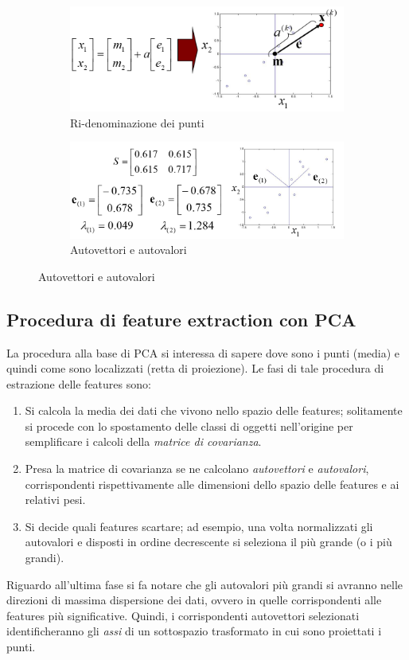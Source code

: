 \documentclass[a4paper,oneside,titlepage]{book}
\begin{document}
\begin{figure}[htp]
	\begin{subfigure}{0.49\textwidth}
	    \centering
		\includegraphics[width=\textwidth, height=\textheight, keepaspectratio]{passo1.png}
		\caption{Ri-denominazione dei punti}
	\end{subfigure}
	\hfill
	\begin{subfigure}{0.49\textwidth}
	    \centering
		\includegraphics[width=\textwidth, height=\textheight, keepaspectratio]{passo5.png}
		\caption{Autovettori e autovalori}
	\end{subfigure}
\end{figure}

\subsection{Procedura di feature extraction con PCA}
La procedura alla base di PCA si interessa di sapere dove sono i punti (media) e quindi come sono localizzati (retta di proiezione). Le fasi di tale procedura di estrazione delle features sono:
\begin{enumerate}
    \item Si calcola la media dei dati che vivono nello spazio delle features; solitamente si procede con lo spostamento delle classi di oggetti nell'origine per semplificare i calcoli della \textit{matrice di covarianza}.
    \item Presa la matrice di covarianza se ne calcolano \textit{autovettori} e \textit{autovalori}, corrispondenti rispettivamente alle dimensioni dello spazio delle features e ai relativi pesi.
    \item Si decide quali features scartare; ad esempio, una volta normalizzati gli autovalori e disposti in ordine decrescente si seleziona il più grande (o i più grandi). 
\end{enumerate}
Riguardo all'ultima fase si fa notare che gli autovalori più grandi si avranno nelle direzioni di massima dispersione dei dati, ovvero in quelle corrispondenti alle features più significative. Quindi, i corrispondenti autovettori selezionati identificheranno gli \textit{assi} di un sottospazio trasformato in cui sono proiettati i punti.
\end{document}
